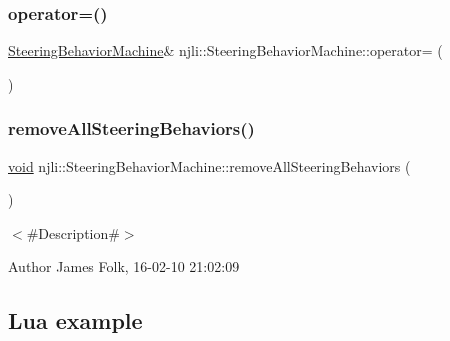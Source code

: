 \mbox{\label{classnjli_1_1_steering_behavior_machine_a666d87bb4e80a99fd5125102bf8f3064}} 
\subsubsection{\texorpdfstring{operator=()}{operator=()}}
{\footnotesize\ttfamily \mbox{\hyperlink{classnjli_1_1_steering_behavior_machine}{Steering\+Behavior\+Machine}}\& njli\+::\+Steering\+Behavior\+Machine\+::operator= (\begin{DoxyParamCaption}\item[{const \mbox{\hyperlink{classnjli_1_1_steering_behavior_machine}{Steering\+Behavior\+Machine}} \&}]{ }\end{DoxyParamCaption})\hspace{0.3cm}{\ttfamily [protected]}}

\mbox{\label{classnjli_1_1_steering_behavior_machine_ac480ec6e9f11918adee87d95167b9b25}} 
\subsubsection{\texorpdfstring{remove\+All\+Steering\+Behaviors()}{removeAllSteeringBehaviors()}}
{\footnotesize\ttfamily \mbox{\hyperlink{_thread_8h_af1e856da2e658414cb2456cb6f7ebc66}{void}} njli\+::\+Steering\+Behavior\+Machine\+::remove\+All\+Steering\+Behaviors (\begin{DoxyParamCaption}{ }\end{DoxyParamCaption})}



$<$\#\+Description\#$>$ 

\begin{DoxyAuthor}{Author}
James Folk, 16-\/02-\/10 21\+:02\+:09
\end{DoxyAuthor}
\hypertarget{classnjli_1_1_steering_behavior_wander_ex1}{}\subsection{Lua example}\label{classnjli_1_1_steering_behavior_wander_ex1}

